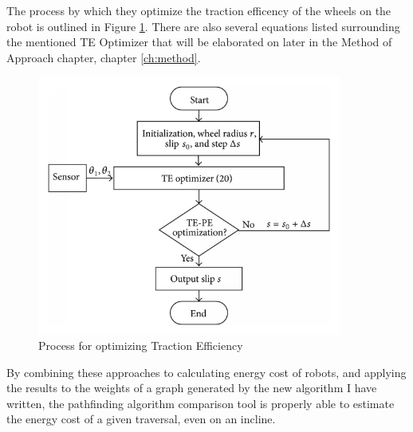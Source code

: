 \par
The process by which they optimize the traction efficency of the wheels on the robot is outlined in Figure \ref{fig:traction_efficiency_flow}. There are also several equations listed surrounding the mentioned TE Optimizer that will be elaborated on later in the Method of Approach chapter, chapter \ref{ch:method}. 
\begin{figure}[H]
    \centering
    \includegraphics[width=10cm]{images/TractionEfficiencyFlowchart.png}
    \caption{Process for optimizing Traction Efficiency}
    \label{fig:traction_efficiency_flow}
\end{figure}
By combining these approaches to calculating energy cost of robots, and applying the results to the weights of a graph generated by the new algorithm I have written, the pathfinding algorithm comparison tool is properly able to estimate the energy cost of a given traversal, even on an incline.
